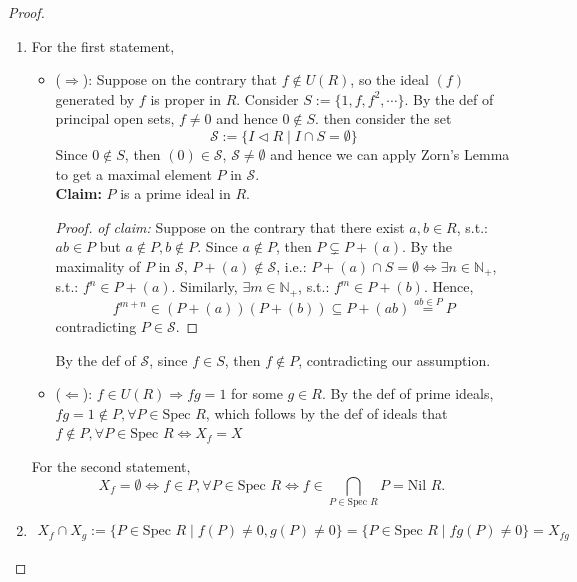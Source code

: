 \begin{proof}
    \begin{enumerate}
        \item For the first statement,
        \begin{itemize}
            \item ($\Rightarrow$): Suppose on the contrary that $f\notin U(R)$, so the ideal $(f)$ generated by $f$ is proper in $R$. Consider $S:= \{1 ,f,f^2 ,\cdots\}$. By the def of principal open sets, $f\neq 0$ and hence $0 \notin S$. then consider the set
            $$\mathcal{S} := \{I \triangleleft R\mid I \cap S=\emptyset \}$$
            Since $0 \notin S$, then $(0) \in \mathcal{S}$, $\mathcal{S} \neq \emptyset$ and hence we can apply Zorn's Lemma to get a maximal element $P$ in $\mathcal{S}$.\\
            \textbf{Claim:} $P$ is a prime ideal in $R$.
            \begin{proof}
                \textit{of claim:} Suppose on the contrary that there exist $a,b \in R$, s.t.: $ab \in P$ but $a \notin P,b \notin P$. Since $a \notin P$, then $P \subsetneq P+(a)$. By the maximality of $P$ in $\mathcal{S}$, $P+(a) \notin \mathcal{S}$, i.e.: $P+(a) \cap S =\emptyset \Leftrightarrow \exists n\in \mathbb{N}_+$, s.t.: $f^n \in P+(a)$. Similarly, $\exists m \in \mathbb{N}_+$, s.t.: $f^m \in P+(b)$. Hence, 
                $$f^{m+n} \in (P+(a)) (P+(b)) \subseteq P+(ab) \overset{ab\in P}{=} P$$
                contradicting $P \in \mathcal{S}$.
            \end{proof}
        By the def of $\mathcal{S}$, since $f\in S$, then $f \notin P$, contradicting our assumption.


        \item ($\Leftarrow$): $f\in U(R) \Rightarrow fg=1$ for some $g \in R$. By the def of prime ideals, $fg =1\notin P, \forall  P\in \text{Spec }R$, which follows by the def of ideals that $f \notin P ,\forall P\in \text{Spec }R \Leftrightarrow X_f=X$
        \end{itemize}
        For the second statement,
        $$X_f =\emptyset \Leftrightarrow f\in P, \forall P\in \text{Spec }R \Leftrightarrow f\in \bigcap_{P \in \text{Spec }R} P=\text{Nil }R.$$

        \item \begin{align*}
            X_f \cap X_g:= \{ P\in \text{Spec }R \mid f(P) \neq 0,g(P) \neq 0\} = \{ P\in \text{Spec }R \mid fg(P) \neq 0\} =X_{fg}
        \end{align*}


\end{enumerate}
\end{proof}
